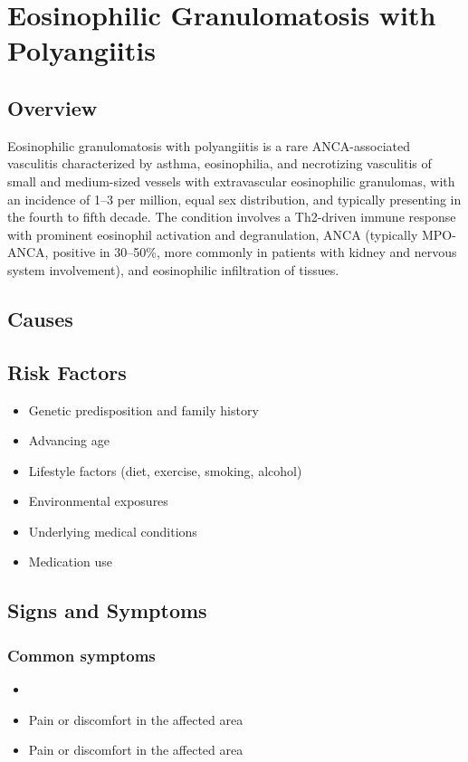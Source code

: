 \chapter{Eosinophilic Granulomatosis with Polyangiitis}
\label{sec:Eosinophilic Granulomatosis with Polyangiitis (EGPA)}

\section{Overview}
Eosinophilic granulomatosis with polyangiitis is a rare ANCA-associated vasculitis characterized by asthma, eosinophilia, and necrotizing vasculitis of small and medium-sized vessels with extravascular eosinophilic granulomas, with an incidence of 1--3 per million, equal sex distribution, and typically presenting in the fourth to fifth decade. The condition involves a Th2-driven immune response with prominent eosinophil activation and degranulation, ANCA (typically MPO-ANCA, positive in 30--50\%, more commonly in patients with kidney and nervous system involvement), and eosinophilic infiltration of tissues.
\section{Causes}
\section{Risk Factors}

\begin{itemize}[noitemsep]
  \item Genetic predisposition and family history
  \item Advancing age
  \item Lifestyle factors (diet, exercise, smoking, alcohol)
  \item Environmental exposures
  \item Underlying medical conditions
  \item Medication use
\end{itemize}
\section{Signs and Symptoms}

\subsection{Common symptoms}
\begin{itemize}[noitemsep]
  \item \item Pain or discomfort in the affected area    \item Pain or discomfort in the affected area
  \end{itemize}

